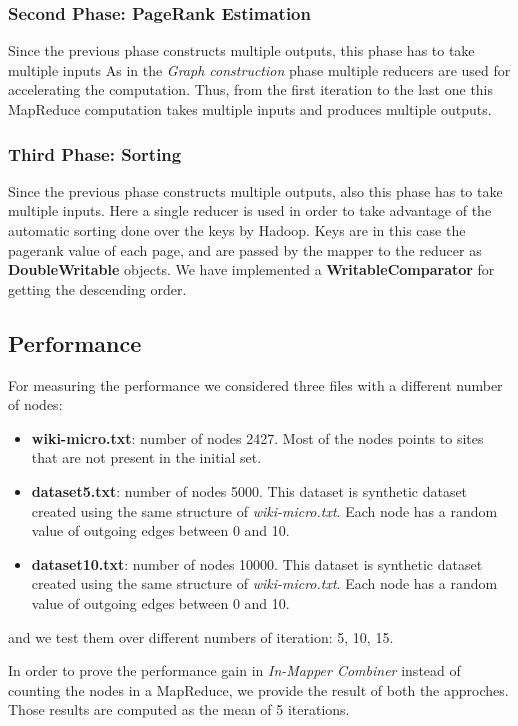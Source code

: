 \subsubsection{Second Phase: PageRank Estimation}
Since the previous phase constructs multiple outputs, this phase has to take multiple inputs
As in the \textit{Graph construction} phase multiple reducers are used for accelerating the computation. Thus, from the first iteration to the last one this MapReduce computation takes multiple inputs and produces multiple outputs.

\subsubsection{Third Phase: Sorting}
Since the previous phase constructs multiple outputs, also this phase has to take multiple inputs. Here a single reducer is used in order to take advantage of the automatic sorting done over the keys by Hadoop. Keys are in this case the pagerank value of each page, and are passed by the mapper to the reducer as \textbf{DoubleWritable} objects. We have implemented a \textbf{WritableComparator} for getting the descending order.

\subsection{Performance}
For measuring the performance we considered three files with a different number of nodes:
\begin{itemize}
	\item \textbf{wiki-micro.txt}: number of nodes 2427. Most of the nodes points to sites that are not present in the initial set.
	\item \textbf{dataset5.txt}: number of nodes 5000. This dataset is synthetic dataset created using the same structure of \textit{wiki-micro.txt}. Each node has a random value of outgoing edges between 0 and 10.
	\item \textbf{dataset10.txt}: number of nodes 10000. This dataset is synthetic dataset created using the same structure of \textit{wiki-micro.txt}. Each node has a random value of outgoing edges between 0 and 10.
\end{itemize}
and we test them over different numbers of iteration: 5, 10, 15.

\noindent In order to prove the performance gain in \textit{In-Mapper Combiner} instead of counting the nodes in a MapReduce, we provide the result of both the approches. Those results are computed as the mean of 5 iterations.

